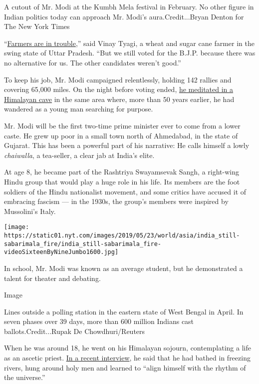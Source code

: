 A cutout of Mr. Modi at the Kumbh Mela festival in February. No other
figure in Indian politics today can approach Mr. Modi's
aura.Credit...Bryan Denton for The New York Times

``\href{https://www.nytimes.com/2019/04/20/world/asia/india-election-modi-farmers.html}{Farmers
are in trouble},'' said Vinay Tyagi, a wheat and sugar cane farmer in
the swing state of Uttar Pradesh. ``But we still voted for the B.J.P.
because there was no alternative for us. The other candidates weren't
good.''

To keep his job, Mr. Modi campaigned relentlessly, holding 142 rallies
and covering 65,000 miles. On the night before voting ended,
\href{https://twitter.com/narendramodi/status/1130040024953569281}{he
meditated in a Himalayan cave} in the same area where, more than 50
years earlier, he had wandered as a young man searching for purpose.

Mr. Modi will be the first two-time prime minister ever to come from a
lower caste. He grew up poor in a small town north of Ahmedabad, in the
state of Gujarat. This has been a powerful part of his narrative: He
calls himself a lowly \emph{chaiwalla}, a tea-seller, a clear jab at
India's elite.

At age 8, he became part of the Rashtriya Swayamsevak Sangh, a
right-wing Hindu group that would play a huge role in his life. Its
members are the foot soldiers of the Hindu nationalist movement, and
some critics have accused it of embracing fascism --- in the 1930s, the
group's members were inspired by Mussolini's Italy.

\texttt{[image: https://static01.nyt.com/images/2019/05/23/world/asia/india\_still-sabarimala\_fire/india\_still-sabarimala\_fire-videoSixteenByNineJumbo1600.jpg]}

In school, Mr. Modi was known as an average student, but he demonstrated
a talent for theater and debating.

Image

Lines outside a polling station in the eastern state of West Bengal in
April. In seven phases over 39 days, more than 600 million Indians cast
ballots.Credit...Rupak De Chowdhuri/Reuters

When he was around 18, he went on his Himalayan sojourn, contemplating a
life as an ascetic priest.
\href{https://www.indiatoday.in/trending-news/story/narendra-modi-humans-of-bombay-interview-part-2-1427633-2019-01-10}{In
a recent interview}, he said that he had bathed in freezing rivers, hung
around holy men and learned to ``align himself with the rhythm of the
universe.''

